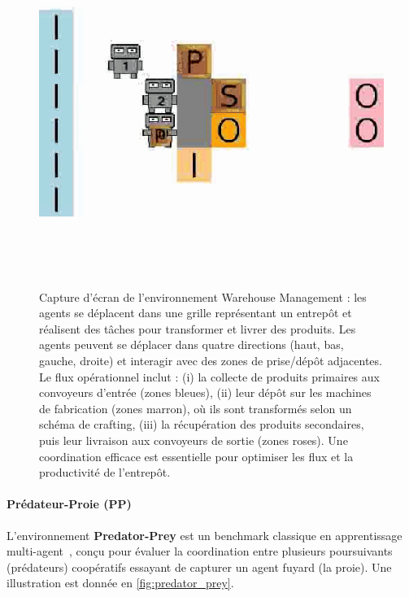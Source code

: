 \begin{figure}[h!]
    \centering
    \includegraphics[width=0.6\linewidth]{figures/wm.png}
    \caption{Capture d'écran de l'environnement Warehouse Management : les agents se déplacent dans une grille représentant un entrepôt et réalisent des tâches pour transformer et livrer des produits. Les agents peuvent se déplacer dans quatre directions (haut, bas, gauche, droite) et interagir avec des zones de prise/dépôt adjacentes. Le flux opérationnel inclut : (i) la collecte de produits primaires aux convoyeurs d'entrée (zones bleues), (ii) leur dépôt sur les machines de fabrication (zones marron), où ils sont transformés selon un schéma de crafting, (iii) la récupération des produits secondaires, puis leur livraison aux convoyeurs de sortie (zones roses). Une coordination efficace est essentielle pour optimiser les flux et la productivité de l'entrepôt.}
    \label{fig:warehouse}
\end{figure}

\paragraph{Prédateur-Proie (PP)}

L'environnement \textbf{Predator-Prey} est un benchmark classique en apprentissage multi-agent~\cite{lowe2017multi}, conçu pour évaluer la coordination entre plusieurs poursuivants (prédateurs) coopératifs essayant de capturer un agent fuyard (la proie). Une illustration est donnée en \autoref{fig:predator_prey}.

